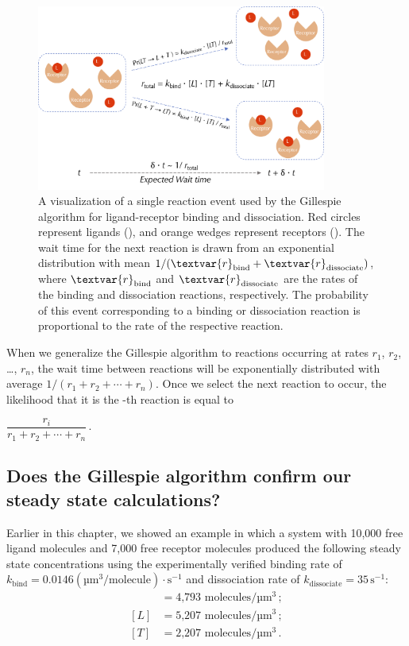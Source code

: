 \begin{figure}[h]
\centering
\mySfFamily
\includegraphics[width = 0.85\textwidth]{../images/chemotaxis_visualizessa.png}
\caption{A visualization of a single reaction event used by the Gillespie algorithm for ligand-receptor binding and dissociation. Red circles represent ligands (), and orange wedges represent receptors (). The wait time for the next reaction is drawn from an exponential distribution with mean $\text{1}/(\textvar{r}_\text{bind} + \textvar{r}_\text{dissociate})$, where $\textvar{r}_\text{bind}$ and $\textvar{r}_\text{dissociate}$ are the rates of the binding and dissociation reactions, respectively. The probability of this event corresponding to a binding or dissociation reaction is proportional to the rate of the respective reaction.}
\label{fig:chemotaxis_visualizessa}
\end{figure}

When we generalize the Gillespie algorithm to  reactions occurring at rates $r_1$, $r_2$, \ldots, $r_n$, the wait time between reactions will be exponentially distributed with average $1 / (r_1 + r_2 + \cdots + r_n)$. Once we select the next reaction to occur, the likelihood that it is the -th reaction is equal to

\begin{center}
$\dfrac{r_i}{r_1 + r_2 + \cdots + r_n}$\,.
\end{center}


\FloatBarrier
{}
\subsection{Does the Gillespie algorithm confirm our steady state calculations?}

Earlier in this chapter, we showed an example in which a system with 10,000 free ligand molecules and 7,000 free receptor molecules produced the following steady state concentrations using the experimentally verified binding rate of $k_\text{bind} = 0.0146 (\text{µm}^3/\text{molecule}) \cdot \text{s}^{-1}$ and dissociation rate of $k_\text{dissociate} = 35\,\text{s}^{-1}$:
\begin{align*}
[LT] & = \text{4,793 molecules}/\text{µm}^3\,;\\
[L] & = \text{5,207 molecules}/\text{µm}^3\,;\\
[T] & = \text{2,207 molecules}/\text{µm}^3\,.
\end{align*}

